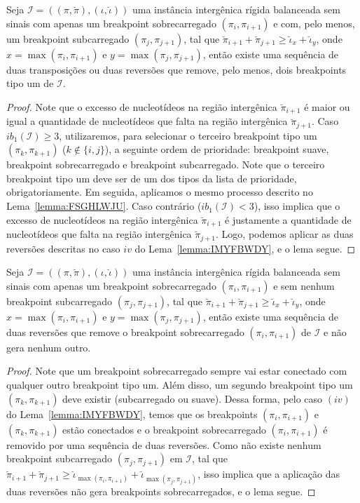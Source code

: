 \begin{lemma}\label{lemma:RHTVEKOL}
Seja $\mathcal{I} = ((\pi,\breve\pi),(\iota,\breve\iota))$ uma instância intergênica rígida balanceada sem sinais com apenas um breakpoint sobrecarregado $(\pi_i,\pi_{i+1})$ e com, pelo menos, um breakpoint subcarregado $(\pi_j,\pi_{j+1})$, tal que $\breve\pi_{i+1} + \breve\pi_{j+1} \ge \breve\iota_{x} + \breve\iota_{y}$, onde $x = \max(\pi_i,\pi_{i+1})$ e $y=\max(\pi_j,\pi_{j+1})$, então existe uma sequência de duas transposições ou duas reversões que remove, pelo menos, dois breakpoints tipo um de $\mathcal{I}$.
\end{lemma}
\begin{proof}
Note que o excesso de nucleotídeos na região intergênica $\breve\pi_{i+1}$ é maior ou igual a quantidade de nucleotídeos que falta na região intergênica $\breve\pi_{j+1}$. Caso $ib_1(\mathcal{I})\ge 3$, utilizaremos, para selecionar o terceiro breakpoint tipo um $(\pi_k,\pi_{k+1})$ ($k \notin \{i,j\}$), a seguinte ordem de prioridade: breakpoint suave, breakpoint sobrecarregado e breakpoint subcarregado. Note que o terceiro breakpoint tipo um deve ser de um dos tipos da lista de prioridade, obrigatoriamente. Em seguida, aplicamos o mesmo processo descrito no Lema~\ref{lemma:FSGHLWJU}. Caso contrário ($ib_1(\mathcal{I}) < 3$), isso implica que o excesso de nucleotídeos na região intergênica $\breve\pi_{i+1}$ é justamente a quantidade de nucleotídeos que falta na região intergênica $\breve\pi_{j+1}$. Logo, podemos aplicar as duas reversões descritas no caso $iv$ do Lema~\ref{lemma:IMYFBWDY}, e o lema segue.
\end{proof}

\begin{lemma}\label{lemma:ICDGSTEE}
Seja $\mathcal{I} = ((\pi,\breve\pi),(\iota,\breve\iota))$ uma instância intergênica rígida balanceada sem sinais com apenas um breakpoint sobrecarregado $(\pi_i,\pi_{i+1})$ e sem nenhum breakpoint subcarregado $(\pi_j,\pi_{j+1})$, tal que $\breve\pi_{i+1} + \breve\pi_{j+1} \ge \breve\iota_{x} + \breve\iota_{y}$, onde $x = \max(\pi_i,\pi_{i+1})$ e $y=\max(\pi_j,\pi_{j+1})$, então existe uma sequência de duas reversões que remove o breakpoint sobrecarregado $(\pi_i,\pi_{i+1})$ de $\mathcal{I}$ e não gera nenhum outro.
\end{lemma}
\begin{proof}
Note que um breakpoint sobrecarregado sempre vai estar conectado com qualquer outro breakpoint tipo um. Além disso, um segundo breakpoint tipo um $(\pi_k,\pi_{k+1})$ deve existir (subcarregado ou suave). Dessa forma, pelo caso $(iv)$ do Lema~\ref{lemma:IMYFBWDY}, temos que os breakpoints $(\pi_i,\pi_{i+1})$ e $(\pi_k,\pi_{k+1})$ estão conectados e o breakpoint sobrecarregado $(\pi_i,\pi_{i+1})$ é removido por uma sequência de duas reversões. Como não existe nenhum breakpoint subcarregado $(\pi_j,\pi_{j+1})$ em $\mathcal{I}$, tal que $\breve\pi_{i+1} + \breve\pi_{j+1} \ge \breve\iota_{\max(\pi_i,\pi_{i+1})} + \breve\iota_{\max(\pi_j,\pi_{j+1})}$, isso implica que a aplicação das duas reversões não gera breakpoints sobrecarregados, e o lema segue.
\end{proof}

